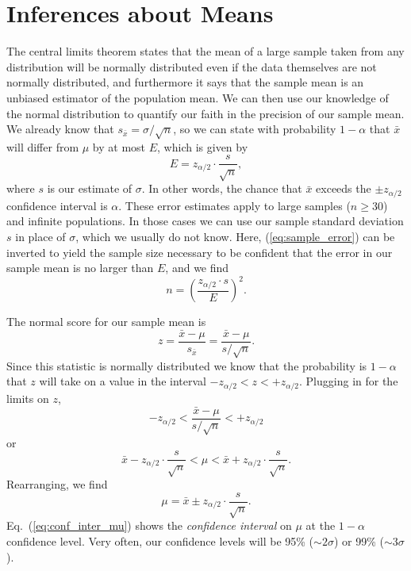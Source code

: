 \section{Inferences about Means}

	The central limits theorem states that the mean of a large sample taken from any distribution will be 
normally distributed even if the data themselves are not normally distributed, and furthermore it says
that the sample mean is an unbiased estimator of the population mean.  We can then use our 
knowledge of the normal distribution to quantify our faith in the precision of our sample mean.  
We already know that $s_{\bar{x}} = \sigma/ \sqrt{n}$,  so we can state with probability $1-\alpha$
that $\bar{x}$ will differ from $\mu$ by at most $E$, which is given by
\begin{equation}
E = z_{\alpha/2} \cdot \frac{s}{\sqrt{n}},
\label{eq:sample_error}
\end{equation}
where $s$ is our estimate of $\sigma$.  In other words, the chance that $\bar{x}$ exceeds
the $\pm z_{\alpha/2}$ confidence interval is $\alpha$.
These error estimates apply to large samples ($n \geq 30$) and infinite populations.  In those cases we 
can use our sample standard deviation $s$ in place of $\sigma$, which we usually do not know.  Here, (\ref{eq:sample_error}) can 
be inverted to yield the sample size necessary to be confident that the error in our sample mean is 
no larger than $E$, and we find
\begin{equation}
n = \left( \frac{z_{\alpha/2} \cdot s}{E} \right)^2.
\end{equation}


The normal score for our sample mean is
\begin{equation}
z = \frac{\bar{x} - \mu} {s_{\bar{x}}} = \frac{\bar{x} - \mu} {s/ \sqrt{n}}.
\end{equation}	 
Since this statistic is normally distributed we know that the probability is $1 - \alpha$ that $z$ will take on 
a value in the interval $-z _{\alpha/2} < z < +z_{\alpha/2}$.  Plugging in for the limits on $z$,
\begin{equation}
-z_{\alpha/2} < \frac{\bar{x} - \mu}{s/\sqrt{n}} < +z_{\alpha/2}
\end{equation} 	  
or							
\begin{equation}
\bar{x} - z _{\alpha/2} \cdot \frac{s}{\sqrt{n}} < \mu < \bar{x} + 
z _{\alpha/2} \cdot  \frac{s}{\sqrt{n}}.
\label{eq:conf_inter}
\end{equation}
Rearranging, we find
\begin{equation}
\mu = \bar{x} \pm z _{\alpha/2} \cdot \frac{s}{\sqrt{n}}.
\label{eq:conf_inter_mu}
\end{equation}
    Eq.\ (\ref{eq:conf_inter_mu}) shows the \emph{confidence interval} on $\mu$ at the $1 - \alpha$ confidence level.
Very often, our confidence levels will be 95\% ($\sim 2 \sigma$) or 99\% ($\sim3\sigma$).

